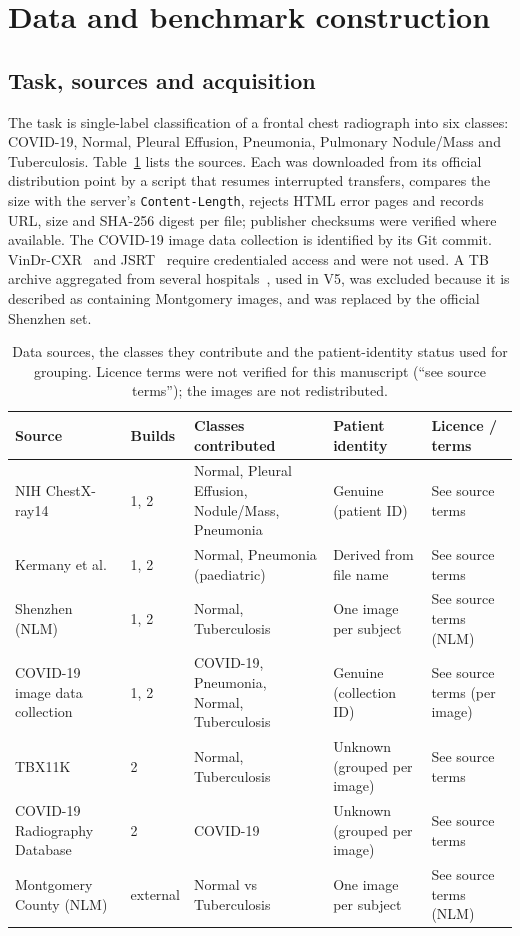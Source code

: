 \section{Data and benchmark construction}
\label{sec:materials}

\subsection{Task, sources and acquisition}
\label{sec:sources}
The task is single-label classification of a frontal chest radiograph into six classes: COVID-19, Normal, Pleural Effusion, Pneumonia, Pulmonary Nodule/Mass and Tuberculosis. Table~\ref{tab:sources} lists the sources. Each was downloaded from its official distribution point by a script that resumes interrupted transfers, compares the size with the server's \texttt{Content-Length}, rejects HTML error pages and records URL, size and SHA-256 digest per file; publisher checksums were verified where available. The COVID-19 image data collection is identified by its Git commit. VinDr-CXR~\cite{nguyen2022vindr} and JSRT~\cite{shiraishi2000development} require credentialed access and were not used. A TB archive aggregated from several hospitals~\cite{rahman2020reliable}, used in V5, was excluded because it is described as containing Montgomery images, and was replaced by the official Shenzhen set.

\begin{table}[t]
\centering
\caption{Data sources, the classes they contribute and the patient-identity status used for grouping. Licence terms were not verified for this manuscript (``see source terms''); the images are not redistributed.}
\label{tab:sources}
\small
\begin{tabular}{@{}p{3.3cm}p{1.2cm}p{3.6cm}p{2.4cm}p{2.9cm}@{}}
\toprule
Source & Builds & Classes contributed & Patient identity & Licence / terms \\
\midrule
NIH ChestX-ray14~\cite{wang2017chestxray8} & 1, 2 & Normal, Pleural Effusion, Nodule/Mass, Pneumonia & Genuine (patient ID) & See source terms \\
Kermany et al.~\cite{kermany2018identifying} & 1, 2 & Normal, Pneumonia (paediatric) & Derived from file name & See source terms \\
Shenzhen (NLM)~\cite{jaeger2014two,candemir2014lung} & 1, 2 & Normal, Tuberculosis & One image per subject & See source terms (NLM) \\
COVID-19 image data collection~\cite{cohen2020covid} & 1, 2 & COVID-19, Pneumonia, Normal, Tuberculosis & Genuine (collection ID) & See source terms (per image) \\
TBX11K~\cite{liu2020rethinking} & 2 & Normal, Tuberculosis & Unknown (grouped per image) & See source terms \\
COVID-19 Radiography Database~\cite{chowdhury2020can,rahman2021exploring} & 2 & COVID-19 & Unknown (grouped per image) & See source terms \\
Montgomery County (NLM)~\cite{jaeger2014two,candemir2014lung} & external & Normal vs Tuberculosis & One image per subject & See source terms (NLM) \\
\bottomrule
\end{tabular}
\end{table}

